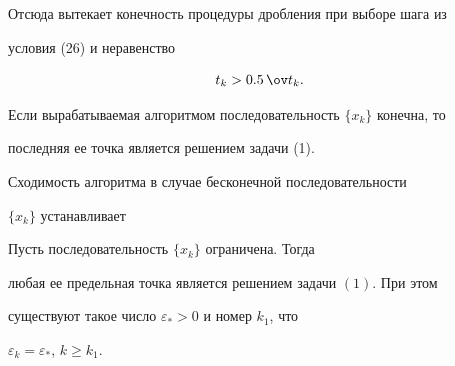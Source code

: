 Отсюда вытекает конечность процедуры дробления при выборе шага из 


условия (26) и неравенство 


\begin{equation} 


t_k>0.5\,\ov t_k.


\end{equation} 


 


Если вырабатываемая алгоритмом последовательность $\{x_k\}$ конечна, то 


последняя ее точка является решением задачи (1). 


 


Сходимость алгоритма в случае бесконечной последовательности 


$\{x_k\}$ устанавливает 


 


\begin{thmnonum} Пусть последовательность $\{x_k\}$ ограничена. Тогда 


любая ее предельная точка является решением задачи $(1)$. При этом 


существуют такое число $\varepsilon_*>0$ и номер $k_1$, что 


$\varepsilon_k=\varepsilon_*$, $k\ge k_1$. 


\end{thmnonum} 


 


